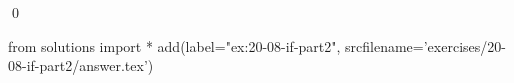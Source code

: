 
\begin{ex}
  \label{ex:20-08-if-part2}
  
  \qed
\end{ex}
\begin{python0}
from solutions import *
add(label="ex:20-08-if-part2",
    srcfilename='exercises/20-08-if-part2/answer.tex')
\end{python0}
